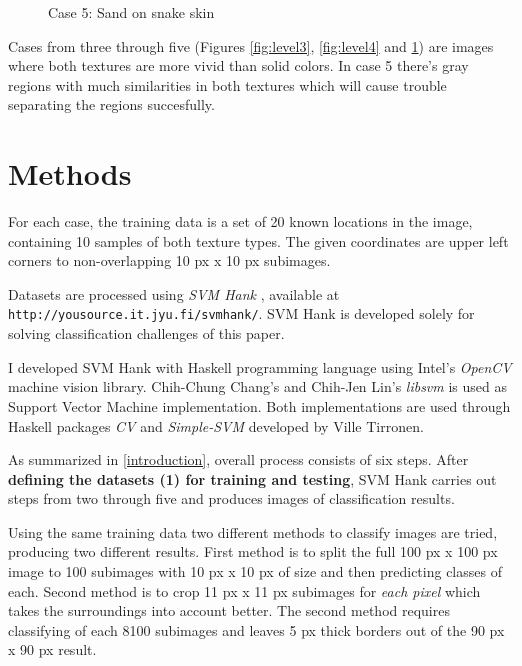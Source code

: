 \documentclass[11pt,twocolumn]{article}
\begin{document}
\begin{figure}[htb]
\centering
\setlength\fboxsep{0pt}
\setlength\fboxrule{1pt}
\caption{Case 5: Sand on snake skin}
\label{fig:level5}
\end{figure}

Cases from three through five (Figures
\ref{fig:level3},
\ref{fig:level4} and
\ref{fig:level5})
are images where both textures are more vivid than solid colors.
In case 5 there's gray regions with much similarities in both
textures which will cause trouble separating the regions
succesfully.



\section{Methods}\label{sec_methods}

For each case,
the training data is a set of 20 known locations
in the image,
containing 10 samples of both texture types.
The given coordinates are upper left corners to non-overlapping
10 px x 10 px subimages.

Datasets are processed using \emph{SVM Hank} \cite{hank},
available at \texttt{http://yousource.it.jyu.fi/svmhank/}.
SVM Hank is developed solely for solving classification
challenges of this paper.

I developed SVM Hank with Haskell programming language using
Intel's \emph{OpenCV} \cite{opencv} machine vision library.
Chih-Chung Chang's and Chih-Jen Lin's \emph{libsvm}
\cite{libsvm} is used as Support Vector Machine implementation.
Both implementations are used through Haskell packages
\emph{CV} \cite{aleator_cv} and \emph{Simple-SVM} \cite{aleator_svm}
developed by Ville Tirronen.

As summarized in \ref{introduction},
overall process consists of six steps.
After \textbf{defining the datasets (1) for training and testing},
SVM Hank carries out steps from two through five
and produces images of classification results.

Using the same training data two different methods to classify
images are tried, producing two different results.
First method is to split the full 100 px x 100 px image to
100 subimages with 10 px x 10 px of size and then predicting
classes of each.
Second method is to crop 11 px x 11 px subimages for
\emph{each pixel}
which takes the surroundings into account better.
The second method requires classifying of each 8100 subimages
and leaves 5 px thick borders out of the 90 px x 90 px
result.
\end{document}

